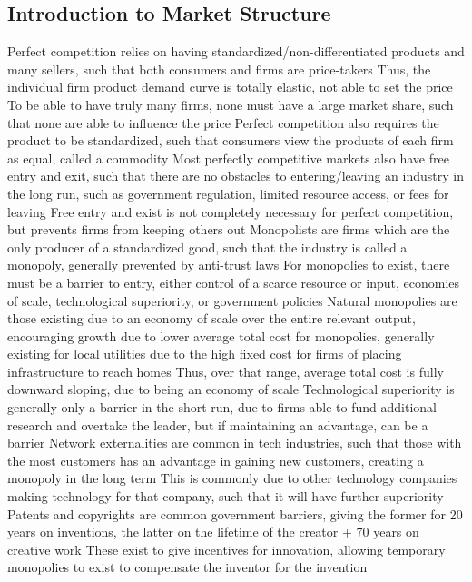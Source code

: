 \documentclass[11 pt, twoside]{article}
\newenvironment{outline*}
{
	\begin{outline}[enumerate]
	}
	{\end{outline}
}
\begin{document}
\subsection{Introduction to Market Structure}
\begin{outline*}
\1 Perfect competition relies on having standardized/non-differentiated products and many sellers, such that both consumers and firms are price-takers
\2 Thus, the individual firm product demand curve is totally elastic, not able to set the price
\2 To be able to have truly many firms, none must have a large market share, such that none are able to influence the price
\1 Perfect competition also requires the product to be standardized, such that consumers view the products of each firm as equal, called a commodity
\2 Most perfectly competitive markets also have free entry and exit, such that there are no obstacles to entering/leaving an industry in the long run, such as government regulation, limited resource access, or fees for leaving
\2 Free entry and exist is not completely necessary for perfect competition, but prevents firms from keeping others out
\1 Monopolists are firms which are the only producer of a standardized good, such that the industry is called a monopoly, generally prevented by anti-trust laws
\1 For monopolies to exist, there must be a barrier to entry, either control of a scarce resource or input, economies of scale, technological superiority, or government policies
\2 Natural monopolies are those existing due to an economy of scale over the entire relevant output, encouraging growth due to lower average total cost for monopolies, generally existing for local utilities due to the high fixed cost for firms of placing infrastructure to reach homes
\3 Thus, over that range, average total cost is fully downward sloping, due to being an economy of scale
\2 Technological superiority is generally only a barrier in the short-run, due to firms able to fund additional research and overtake the leader, but if maintaining an advantage, can be a barrier
\3 Network externalities are common in tech industries, such that those with the most customers has an advantage in gaining new customers, creating a monopoly in the long term
\3 This is commonly due to other technology companies making technology for that company, such that it will have further superiority
\2 Patents and copyrights are common government barriers, giving the former for 20 years on inventions, the latter on the lifetime of the creator + 70 years on creative work
\3 These exist to give incentives for innovation, allowing temporary monopolies to exist to compensate the inventor for the invention

\end{outline*}
\end{document}
